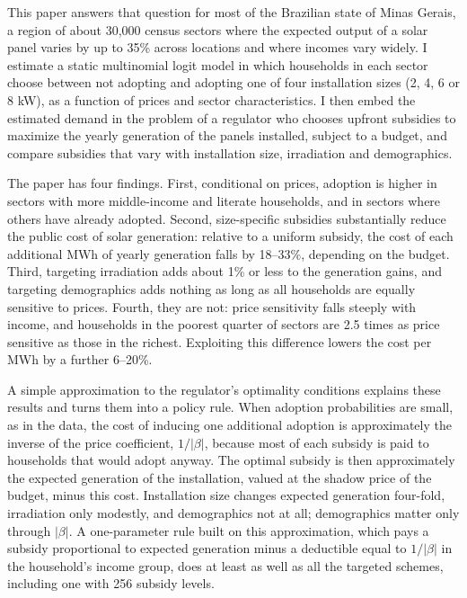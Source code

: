 \documentclass[final,3p,times,authoryear]{elsarticle}
\begin{document}
    This paper answers that question for most of the Brazilian state of Minas Gerais, a region of about 30,000 census sectors where the expected output of a solar panel varies by up to 35\% across locations and where incomes vary widely. I estimate a static multinomial logit model in which households in each sector choose between not adopting and adopting one of four installation sizes (2, 4, 6 or 8 kW), as a function of prices and sector characteristics. I then embed the estimated demand in the problem of a regulator who chooses upfront subsidies to maximize the yearly generation of the panels installed, subject to a budget, and compare subsidies that vary with installation size, irradiation and demographics.

    The paper has four findings. First, conditional on prices, adoption is higher in sectors with more middle-income and literate households, and in sectors where others have already adopted. Second, size-specific subsidies substantially reduce the public cost of solar generation: relative to a uniform subsidy, the cost of each additional MWh of yearly generation falls by 18--33\%, depending on the budget. Third, targeting irradiation adds about 1\% or less to the generation gains, and targeting demographics adds nothing as long as all households are equally sensitive to prices. Fourth, they are not: price sensitivity falls steeply with income, and households in the poorest quarter of sectors are 2.5 times as price sensitive as those in the richest. Exploiting this difference lowers the cost per MWh by a further 6--20\%.

    A simple approximation to the regulator's optimality conditions explains these results and turns them into a policy rule. When adoption probabilities are small, as in the data, the cost of inducing one additional adoption is approximately the inverse of the price coefficient, $1/|\beta|$, because most of each subsidy is paid to households that would adopt anyway. The optimal subsidy is then approximately the expected generation of the installation, valued at the shadow price of the budget, minus this cost. Installation size changes expected generation four-fold, irradiation only modestly, and demographics not at all; demographics matter only through $|\beta|$. A one-parameter rule built on this approximation, which pays a subsidy proportional to expected generation minus a deductible equal to $1/|\beta|$ in the household's income group, does at least as well as all the targeted schemes, including one with 256 subsidy levels.
\end{document}
